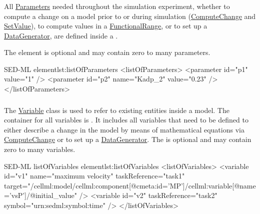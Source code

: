 \subsubsection{}
\label{sec:listOfParameters}
All \hyperref[class:parameter]{Parameters} needed throughout the simulation experiment, whether to compute a change on a model prior to or during simulation (\hyperref[class:computeChange]{ComputeChange} and \hyperref[class:setValue]{SetValue}), to compute values in a \hyperref[class:functionalRange]{FunctionalRange}, or to set up a \hyperref[class:dataGenerator]{DataGenerator}, are defined inside a .

The element is optional and may contain zero to many parameters.

\begin{myXmlLst}{SED-ML  element}{lst:listOfParameters}
<listOfParameters>
	<parameter id="p1" value="1" />
	<parameter id="p2" name="Kadp_2" value="0.23" />
</listOfParameters>
\end{myXmlLst}


\subsubsection{}
\label{sec:listOfVariables}
The \hyperref[class:variable]{Variable} class is used to refer to existing entities inside a model. The container for all variables is  . It includes all variables that need to be defined to either describe a change in the model by means of mathematical equations via \hyperref[class:computeChange]{ComputeChange} or to set up a \hyperref[class:dataGenerator]{DataGenerator}. The  is optional and may contain zero to many variables. 

\begin{myXmlLst}{SED-ML listOfVariables element}{lst:listOfVariables}
<listOfVariables>
	<variable id="v1" name="maximum velocity" taskReference="task1" 
		target="/cellml:model/cellml:component[@cmeta:id='MP']/cellml:variable[@name='vsP']/@initial_value" />
	<variable id="v2" taskReference="task2" symbol="urn:sedml:symbol:time" />
</listOfVariables>
\end{myXmlLst}

